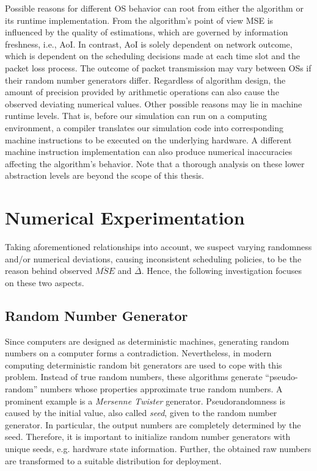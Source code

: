 Possible reasons for different OS behavior can root from either the algorithm or
its runtime implementation. From the algorithm's point of view MSE is influenced
by the quality of estimations, which are governed by information freshness,
i.e., AoI. In contrast, AoI is solely dependent on network outcome, which is
dependent on the scheduling decisions made at each time slot and the packet loss
process. The outcome of packet transmission may vary between OSs if their random
number generators differ. Regardless of algorithm design, the amount of
precision provided by arithmetic operations can also cause the observed
deviating numerical values. Other possible reasons may lie in machine runtime
levels. That is, before our simulation can run on a computing environment, a
compiler translates our simulation code into corresponding machine instructions
to be executed on the underlying hardware. A different machine instruction
implementation can also produce numerical inaccuracies affecting the algorithm's
behavior. Note that a thorough analysis on these lower abstraction levels are
beyond the scope of this thesis.


\section{Numerical Experimentation} \label{sec:experiments}

Taking aforementioned relationships into account, we suspect varying randomness
and/or numerical deviations, causing inconsistent scheduling policies, to be the
reason behind observed $\overline{MSE}$ and $\overline{\Delta}$. Hence, the
following investigation focuses on these two aspects.

\subsection{Random Number Generator}

Since computers are designed as deterministic machines, generating random
numbers on a computer forms a contradiction. Nevertheless, in modern computing
deterministic random bit generators are used to cope with this problem. Instead
of true random numbers, these algorithms generate ``pseudo-random'' numbers
whose properties approximate true random numbers. A prominent example is a
\textit{Mersenne Twister} generator. Pseudorandomness is caused by the initial
value, also called \textit{seed}, given to the random number generator. In
particular, the output numbers are completely determined by the seed. Therefore,
it is important to initialize random number generators with unique seeds, e.g.
hardware state information. Further, the obtained raw numbers are transformed to
a suitable distribution for deployment.

